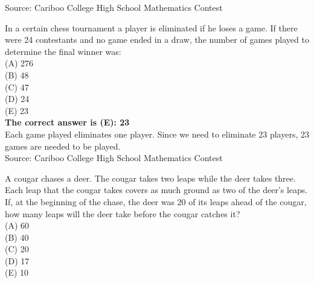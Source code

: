 \documentclass{article}
\begin{document}
\scriptsize
Source: Cariboo College High School Mathematics Contest

\normalsize
In a certain chess tournament a player is eliminated if he loses a game. If there were 24 contestants and no game ended in a draw, the number of games played to determine the final winner was:\\
(A) 276\\
(B) 48\\
(C) 47\\
(D) 24\\
(E) 23\\


\textbf{The correct answer is (E): 23}\\[1 ex]
Each game played eliminates one player. Since we need to eliminate 23 players, 23 games are needed to be played.
\\[5 ex]

\scriptsize
Source: Cariboo College High School Mathematics Contest

\normalsize
A cougar chases a deer. The cougar takes two leaps while the deer takes three. Each leap that the cougar takes covers as much ground as two of the deer's leaps. If, at the beginning of the chase, the deer was 20 of its leaps ahead of the cougar, how many leaps will the deer take before the cougar catches it?\\
(A) 60\\
(B) 40\\
(C) 20\\
(D) 17\\
(E) 10\\

\end{document}
